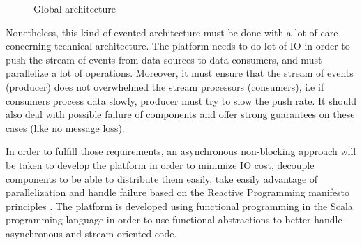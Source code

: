 \begin{figure}[h]
  \begin{center}
    \caption{Global architecture}
    \label{fig:main_archi}
  \end{center}
\end{figure}

Nonetheless, this kind of evented architecture must be done with a lot of care concerning technical architecture.
The platform needs to do lot of IO in order to push the stream of events from data sources to data consumers, and must
parallelize a lot of operations. Moreover, it must ensure that the stream of events (producer) does not overwhelmed the stream
processors (consumers), i.e if consumers process data slowly, producer must try to slow the push rate. It should also deal with possible
failure of components and offer strong guarantees on these cases (like no message loss).

In order to fulfill those requirements, an asynchronous non-blocking approach will be taken to develop the platform in order to
minimize IO cost, decouple components to be able to distribute them easily, take easily advantage of parallelization and handle failure based on the 
Reactive Programming manifesto principles . The platform is developed using functional programming in
the Scala programming language  in order to use functional abstractions to better handle asynchronous and stream-oriented code.
\\

